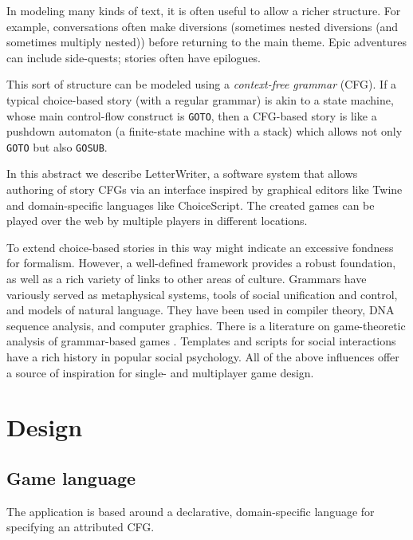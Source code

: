 \documentclass{acm_proc_article-sp}
\begin{document}
In modeling many kinds of text, it is often useful to allow a richer structure.
For example, conversations often make diversions (sometimes nested diversions (and sometimes multiply nested))
before returning to the main theme.
Epic adventures can include side-quests; stories often have epilogues.

This sort of structure can be modeled using a {\em context-free grammar} (CFG).
If a typical choice-based story (with a regular grammar) is akin to a state machine,
 whose main control-flow construct is {\tt GOTO},
then a CFG-based story is like a pushdown automaton (a finite-state machine with a stack)
 which allows not only {\tt GOTO} but also {\tt GOSUB}.

In this abstract we describe LetterWriter, a software system that allows authoring of story CFGs
via an interface inspired by graphical editors like Twine and domain-specific languages like ChoiceScript.
The created games can be played over the web by multiple players in different locations.

To extend choice-based stories in this way might indicate an excessive fondness for formalism.
However, a well-defined framework provides a robust foundation, as well as a rich variety of links to other areas of culture.
Grammars have variously served as metaphysical systems\cite{Ashtadhyayi,luhtala2005grammar},
tools of social unification and control\cite{AcademieFrancaise,RobertLowth},
and models of natural language\cite{Durbin98}.
They have been used in compiler theory\cite{aho2007compilers},
DNA sequence analysis\cite{Durbin98}, and
computer graphics\cite{LSystems}.
There is a literature on game-theoretic analysis of grammar-based games
\cite{DBLP:conf/icalp/EtessamiWY08}.
Templates and scripts for social interactions
 have a rich history in popular social psychology\cite{berne1973games,berne1973you}.
All of the above influences offer a source of inspiration for single- and multiplayer game design.

\section{Design}

\subsection{Game language}

The application is based around
a declarative, domain-specific language for specifying an attributed CFG.
\end{document}
